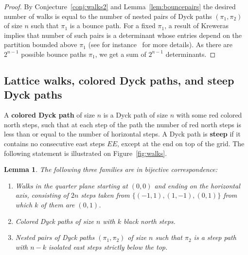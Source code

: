 \documentclass{amsart}
\newtheorem{lemma}[theorem]{Lemma}
\theoremstyle{definition}
\newcommand{\fref}[1]{Figure~\ref{#1}} %
\newcommand{\defn}[1]{\textbf{\textsf{\color{PineGreen} #1}}} %
\begin{document}
\begin{proof}
By Conjecture~\ref{conj:walks2} and Lemma~\ref{lem:bouncepairs} the desired number of walks is equal to the number of nested pairs of Dyck paths $(\pi_1,\pi_2)$ of size $n$ such that $\pi_1$ is a bounce path. 
For a fixed $\pi_1$, a result of Kreweras~\cite{Kreweras} implies that number of such pairs is a determinant whose entries depend on the partition bounded above $\pi_1$ (see for instance~\cite[Sect.~5]{CeballosGonzalezDLeon} for more details).
As there are $2^{n-1}$ possible bounce paths $\pi_1$, we get a sum of $2^{n-1}$ determinants.
\end{proof}


\subsection{Lattice walks, colored Dyck paths, and steep Dyck paths}
\label{sec:coloredDyckpaths}

A \defn{colored Dyck path} of size $n$ is a Dyck path of size $n$ with some red colored north steps, such that at each step of the path the number of red north steps is less than or equal to the number of horizontal steps. A Dyck path is \defn{steep} if it contains no consecutive east steps $EE$, except at the end on top of the grid. 
The following statement is illustrated on \fref{fig:walks}.

\begin{lemma}
\label{lem:coloredDyckpaths}
The following three families are in bijective correspondence:
\begin{enumerate}
\item Walks in the quarter plane starting at $(0,0)$ and ending on the horizontal axis, consisting of $2n$ steps taken from $\{(-1, 1), (1, -1), (0, 1)\}$ from which $k$ of them are $(0,1)$. 
\item Colored Dyck paths of size $n$ with $k$ black north steps.
\item Nested pairs of Dyck paths $(\pi_1,\pi_2)$ of size $n$ such that $\pi_2$ is a steep path with $n-k$ isolated east steps strictly below the top.
\end{enumerate}
\end{lemma}
\end{document}
